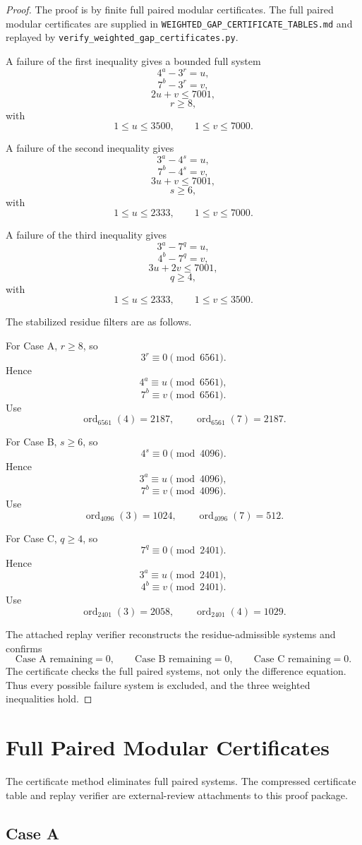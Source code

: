 \documentclass[11pt]{article}
\newcommand{\ord}{\operatorname{ord}}
\begin{document}
\begin{proof}
The proof is by finite full paired modular certificates. The full paired modular certificates are supplied in
\texttt{WEIGHTED\_GAP\_CERTIFICATE\_TABLES.md} and replayed by
\texttt{verify\_weighted\_gap\_certificates.py}.

A failure of the first inequality gives a bounded full system
\[
4^a-3^r=u,
\]
\[
7^b-3^r=v,
\]
\[
2u+v\le7001,
\]
\[
r\ge8,
\]
with
\[
1\le u\le3500,\qquad 1\le v\le7000.
\]

A failure of the second inequality gives
\[
3^a-4^s=u,
\]
\[
7^b-4^s=v,
\]
\[
3u+v\le7001,
\]
\[
s\ge6,
\]
with
\[
1\le u\le2333,\qquad 1\le v\le7000.
\]

A failure of the third inequality gives
\[
3^a-7^q=u,
\]
\[
4^b-7^q=v,
\]
\[
3u+2v\le7001,
\]
\[
q\ge4,
\]
with
\[
1\le u\le2333,\qquad 1\le v\le3500.
\]

The stabilized residue filters are as follows.

For Case A, \(r\ge8\), so
\[
3^r\equiv0\pmod{6561}.
\]
Hence
\[
4^a\equiv u\pmod{6561},
\]
\[
7^b\equiv v\pmod{6561}.
\]
Use
\[
\ord_{6561}(4)=2187,\qquad \ord_{6561}(7)=2187.
\]

For Case B, \(s\ge6\), so
\[
4^s\equiv0\pmod{4096}.
\]
Hence
\[
3^a\equiv u\pmod{4096},
\]
\[
7^b\equiv v\pmod{4096}.
\]
Use
\[
\ord_{4096}(3)=1024,\qquad \ord_{4096}(7)=512.
\]

For Case C, \(q\ge4\), so
\[
7^q\equiv0\pmod{2401}.
\]
Hence
\[
3^a\equiv u\pmod{2401},
\]
\[
4^b\equiv v\pmod{2401}.
\]
Use
\[
\ord_{2401}(3)=2058,\qquad \ord_{2401}(4)=1029.
\]

The attached replay verifier reconstructs the residue-admissible systems and confirms
\[
\text{Case A remaining}=0,\qquad
\text{Case B remaining}=0,\qquad
\text{Case C remaining}=0.
\]
The certificate checks the full paired systems, not only the difference equation. Thus every possible failure system is excluded, and the three weighted inequalities hold.
\end{proof}

\section{Full Paired Modular Certificates}

The certificate method eliminates full paired systems. The compressed certificate table and replay verifier are external-review attachments to this proof package.

\subsection*{Case A}
\end{document}
